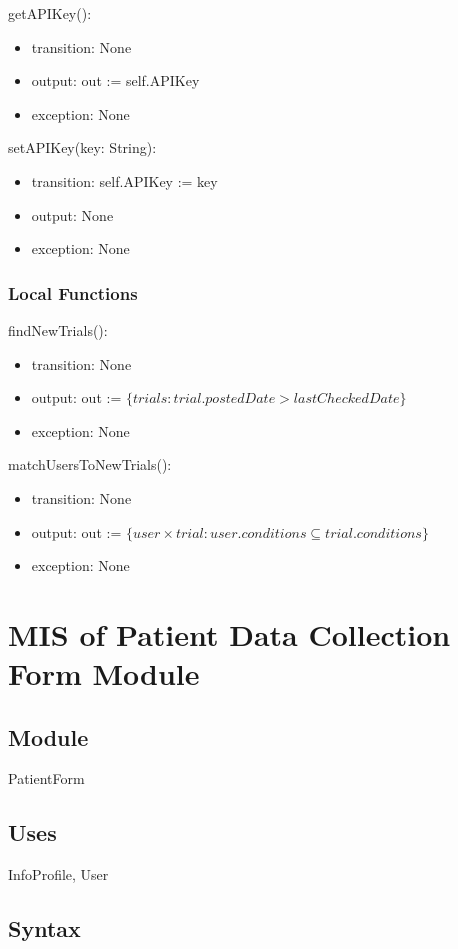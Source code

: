 \documentclass[12pt, titlepage]{article}
\begin{document}
\noindent getAPIKey():
\begin{itemize}
\item transition: None
\item output: out := self.APIKey
\item exception: None
\end{itemize}

\noindent setAPIKey(key: String):
\begin{itemize}
\item transition: self.APIKey := key
\item output: None
\item exception: None
\end{itemize}


\subsubsection{Local Functions}
\noindent findNewTrials():
\begin{itemize}
\item transition: None
\item output: out := $\{trials : trial.postedDate > lastCheckedDate\}$
\item exception: None
\end{itemize}

\noindent matchUsersToNewTrials():
\begin{itemize}
\item transition: None
\item output: out := $\{user \times trial : user.conditions \subseteq trial.conditions\}$
\item exception: None
\end{itemize}


\section{MIS of Patient Data Collection Form Module} \label{PatientDataForm}

\subsection{Module}

PatientForm

\subsection{Uses}
InfoProfile, User

\subsection{Syntax}
\end{document}
